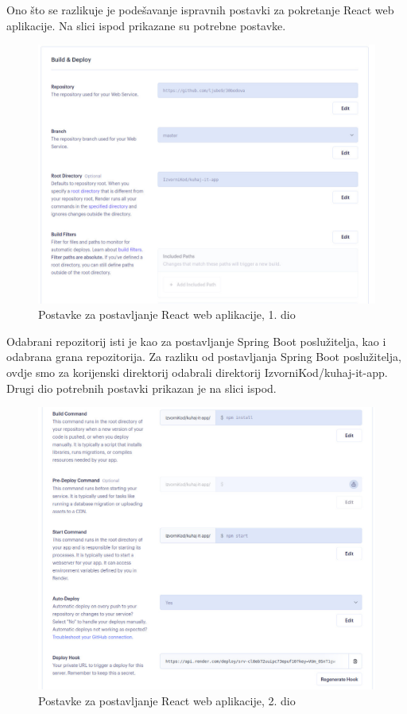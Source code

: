 	Ono što se razlikuje je podešavanje ispravnih postavki za pokretanje React web aplikacije. Na slici ispod prikazane su potrebne postavke.
	
		\begin{figure}[H]
			\includegraphics[scale=0.4]{slike/Render_FRONTEND_1.JPG} %
			\centering
			\caption{Postavke za postavljanje React web aplikacije, 1. dio}
			\label{Postavke za postavljanje React web aplikacije, 1. dio}
		\end{figure}
		
	Odabrani repozitorij isti je kao za postavljanje Spring Boot poslužitelja, kao i odabrana grana repozitorija.
	Za razliku od postavljanja Spring Boot poslužitelja, ovdje smo za korijenski direktorij odabrali direktorij IzvorniKod/kuhaj-it-app. Drugi dio potrebnih postavki prikazan je na slici ispod.
	
			\begin{figure}[H]
			\includegraphics[scale=0.4]{slike/Render_FRONTEND_2.JPG} %
			\centering
			\caption{Postavke za postavljanje React web aplikacije, 2. dio}
			\label{Postavke za postavljanje React web aplikacije, 2. dio}
		\end{figure}
		
